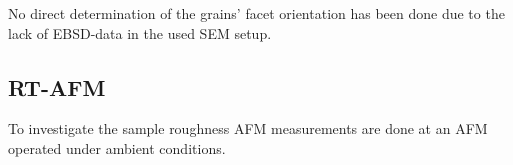 No direct determination of the grains' facet orientation has been done due to the lack of EBSD-data in the used SEM setup.
	
	
	\subsection{RT-AFM}
	\label{sec:foil-AFM}
	To investigate the sample roughness AFM measurements are done at an AFM operated under ambient conditions.
	
